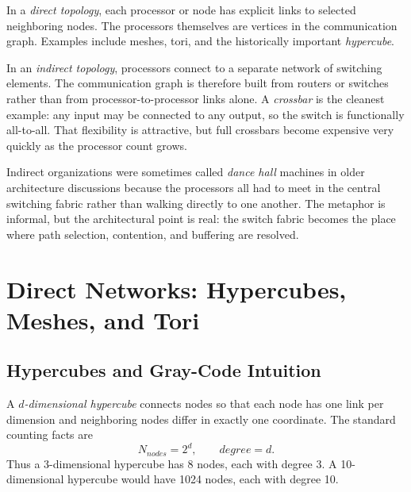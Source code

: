 In a \textit{direct topology}, each processor or node has explicit links to selected neighboring nodes.
The processors themselves are vertices in the communication graph.
Examples include meshes, tori, and the historically important \textit{hypercube}.

In an \textit{indirect topology}, processors connect to a separate network of switching elements.
The communication graph is therefore built from routers or switches rather than from processor-to-processor links alone.
A \textit{crossbar} is the cleanest example: any input may be connected to any output, so the switch is functionally all-to-all.
That flexibility is attractive, but full crossbars become expensive very quickly as the processor count grows.

Indirect organizations were sometimes called \textit{dance hall} machines in older architecture discussions because the processors all had to meet in the central switching fabric rather than walking directly to one another.
The metaphor is informal, but the architectural point is real: the switch fabric becomes the place where path selection, contention, and buffering are resolved.


\section{Direct Networks: Hypercubes, Meshes, and Tori}\label{sec:pin-direct}

\subsection{Hypercubes and Gray-Code Intuition}\label{subsec:pin-hypercube}
A \textit{$d$-dimensional hypercube} connects nodes so that each node has one link per dimension and neighboring nodes differ in exactly one coordinate.
The standard counting facts are
\begin{equation}\label{eq:ch10-formula-hypercube}
    N_{nodes}=2^d, \qquad degree=d.
\end{equation}
Thus a 3-dimensional hypercube has 8 nodes, each with degree 3.
A 10-dimensional hypercube would have 1024 nodes, each with degree 10.

